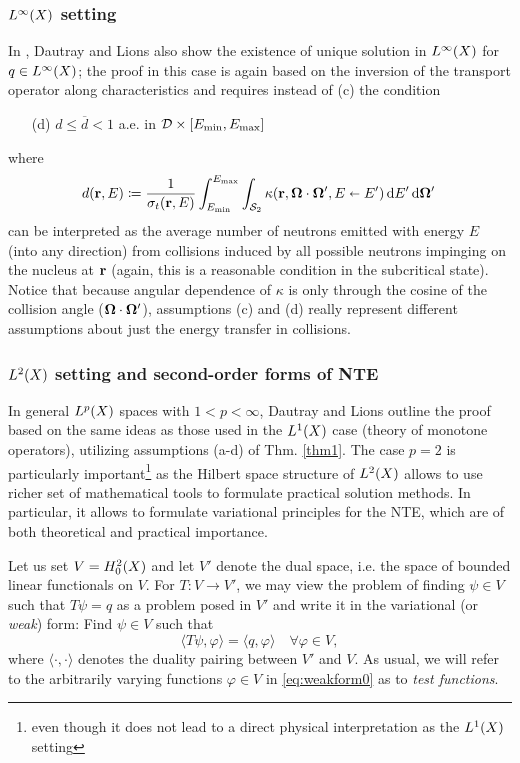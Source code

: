 \subsubsection{$\Lp[\infty](X)$ setting}
In \cite[Chap. XXI, \S 2, Proposition 6]{DautrayLions}, Dautray and Lions also 
show the existence of unique solution in $\Lp[\infty](X)$ for $q\in \Lp[\infty](X)$; the proof in this case is again
based on the inversion of the transport operator along characteristics and requires instead of
 (c) the condition
\begin{enumerate}
  \item[(d)] $d \leq \overline d < 1$ a.e. in $\VV\times[\Emin,\Emax]$
\end{enumerate}
where
\begin{equation}\label{eq:d} 
d(\br,E) \coloneqq 
  \frac{1}{\sigma_t(\br,E)}\int_{\Emin}^{\Emax}\int_{\Sphere} \kappa(\br,\bomega\cdot\bomega',
	    E\sla E')\,\d{E'}\d{\bomega'}
\end{equation}
can be interpreted as the average number of neutrons emitted with energy $E$ (into any direction) from
collisions induced by all possible neutrons impinging on the nucleus at $\br$ (again, this is a reasonable condition
in the subcritical state). Notice that because angular dependence of $\kappa$ is only through the cosine of the
collision angle ($\bomega\cdot\bomega'$), assumptions (c) and (d) really represent different assumptions about just the energy
transfer in collisions. 

\subsubsection{$\Lp[2](X)$ setting and second-order forms of NTE}\label{sec:L2}
In general $\Lp(X)$ spaces with $1 < p < \infty$, Dautray and Lions outline the proof based on the same ideas as those
used in the $\Lp[1](X)$ case (theory of monotone operators), utilizing assumptions (a-d) of Thm. \ref{thm1}.  The case
$p = 2$ is particularly important\footnote{even though it does not lead to a direct physical interpretation as  the
$\Lp[1](X)$ setting} as the Hilbert space structure of $\Lp[2](X)$ allows to use richer set of mathematical tools to
formulate practical solution methods. In particular, it allows to formulate variational principles for the NTE, which
are of both theoretical and practical importance. 

Let us set $V = \Hpnot[2](X)$ and let $V'$
denote the dual space, i.e.
the space of bounded linear functionals on $V$.  For $T : V \to V'$, we may view the problem of
finding $\psi \in V$ such that $T\psi = q$
as a problem posed in $V'$ and write it in the variational (or \textit{weak}) form: Find $\psi \in V$ such that 
\begin{equation}\label{eq:weakform0}
	\langle T\psi, \varphi \rangle = \langle q, \varphi \rangle  \quad \forall \varphi\in V,
\end{equation}
where $\langle \cdot,\cdot\rangle$ denotes the duality pairing between $V'$ and $V$. As usual, we will refer to the
arbitrarily varying functions $\varphi\in V$ in \eqref{eq:weakform0} as to \textit{test functions}. 

